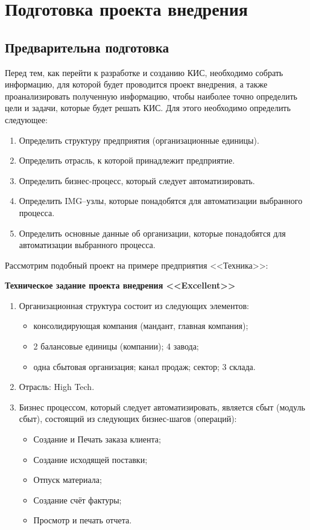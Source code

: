 \chapter{Подготовка проекта внедрения}

\section{Предварительна подготовка}

Перед тем, как перейти к разработке и созданию КИС, необходимо собрать
информацию, для которой будет проводится проект внедрения, а также проанализировать
полученную информацию, чтобы наиболее точно определить цели и задачи, которые будет
решать КИС. Для этого необходимо определить следующее:

\begin{enumerate}
\item Определить структуру предприятия (организационные единицы).
\item Определить отрасль, к которой принадлежит предприятие.
\item Определить бизнес-процесс, который следует автоматизировать.
\item Определить IMG–узлы, которые понадобятся для автоматизации выбранного процесса.
\item Определить основные данные об организации, которые понадобятся для автоматизации выбранного процесса.
\end{enumerate}

Рассмотрим подобный проект на примере предприятия <<Техника>>:

\textbf{Техническое задание проекта внедрения <<Excellent>>}
\begin{enumerate}
\item Организационная структура состоит из следующих элементов:
\begin{itemize}
    \item консолидирующая компания (мандант, главная компания);
    \item 2 балансовые единицы (компании); 4 завода;
    \item одна сбытовая организация; канал продаж; сектор; 3 склада.
\end{itemize}
\item Отрасль: High Tech.
\item Бизнес процессом, который следует автоматизировать, является сбыт (модуль сбыт), состоящий из следующих бизнес-шагов (операций):
\begin{itemize}
    \item Создание и Печать заказа клиента;
    \item Создание исходящей поставки;
    \item Отпуск материала;
    \item Создание счёт фактуры;
    \item Просмотр и печать отчета.
\end{itemize}
\end{enumerate}

